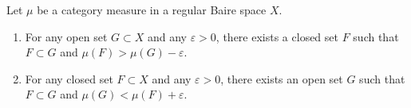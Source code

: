 Let $\mu$ be a category measure in a regular Baire space $X$.

\begin{enumerate}
\item For any open set $G \subset X$ and any $\varepsilon > 0$, there exists a closed set $F$ such that $F \subset G$ and $\mu(F) > \mu(G) - \varepsilon$.
\item For any closed set $F \subset X$ and any $\varepsilon > 0$, there exists an open set $G$ such that $F \subset G$ and $\mu(G) < \mu(F) + \varepsilon$.
\end{enumerate}
